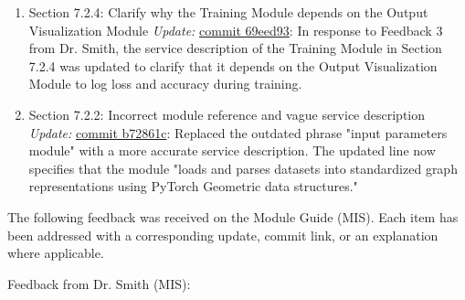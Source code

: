 \documentclass{article}
\begin{document}
\begin{enumerate}
    \item Section 7.2.4: Clarify why the Training Module depends on the Output Visualization Module  
    \newline \textit{Update:} \href{https://github.com/Yuanqi-X/Re-ProtGNN/commit/69eed93}{commit 69eed93}: In response to Feedback 3 from Dr. Smith, the service description of the Training Module in Section 7.2.4 was updated to clarify that it depends on the Output Visualization Module to log loss and accuracy during training. 

    \item Section 7.2.2: Incorrect module reference and vague service description  
    \newline \textit{Update:} \href{https://github.com/Yuanqi-X/Re-ProtGNN/commit/b72861c}{commit b72861c}: Replaced the outdated phrase "input parameters module" with a more accurate service description. The updated line now specifies that the module "loads and parses datasets into standardized graph representations using PyTorch Geometric data structures."
\end{enumerate}


The following feedback was received on the Module Guide (MIS). Each item has been addressed with a corresponding update, commit link, or an explanation where applicable.

Feedback from Dr. Smith (MIS):
\end{document}
